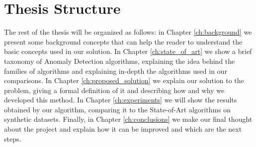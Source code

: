 \section{Thesis Structure}
The rest of the thesis will be organized as follows: in Chapter \ref{ch:background} we present some background concepts that can help the reader to understand the basic concepts used in our solution. In Chapter \ref{ch:state_of_art} we show a brief taxonomy of Anomaly Detection algorithms, explaining the idea behind the families of algorithms and explaining in-depth the algorithms used in our comparisons. \newline
In Chapter \ref{ch:proposed_solution} we explain our solution to the problem, giving a formal definition of it and describing how and why we developed this method. In Chapter \ref{ch:experiments} we will show the results obtained by our algorithm, comparing it to the State-of-Art algorithms on synthetic datasets.
Finally, in Chapter \ref{ch:conclusions} we make our final thought about the project and explain how it can be improved and which are the next steps.